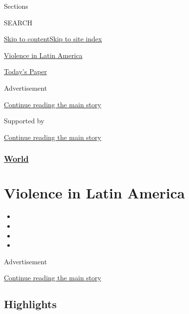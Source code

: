 Sections

SEARCH

\protect\hyperlink{site-content}{Skip to
content}\protect\hyperlink{site-index}{Skip to site index}

\href{https://www.nytimes.com/spotlight/violence-in-latin-america}{Violence
in Latin America}

\href{https://myaccount.nytimes.com/auth/login?response_type=cookie\&client_id=vi}{}

\href{https://www.nytimes.com/section/todayspaper}{Today's Paper}

Advertisement

\protect\hyperlink{after-top}{Continue reading the main story}

Supported by

\protect\hyperlink{after-sponsor}{Continue reading the main story}

\hypertarget{world}{%
\subsubsection{\texorpdfstring{\href{/section/world}{World}}{World}}\label{world}}

\hypertarget{violence-in-latin-america}{%
\section{Violence in Latin America}\label{violence-in-latin-america}}

\begin{itemize}
\item
\item
\item
\item
\end{itemize}

Advertisement

\protect\hyperlink{after-subheader}{Continue reading the main story}

\hypertarget{highlights}{%
\subsection{Highlights}\label{highlights}}

